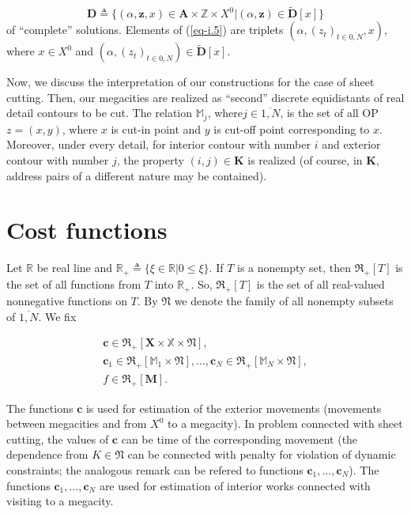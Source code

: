 \documentclass{article}
\begin{document}
\begin{equation}
  \label{eq-i.5}
  \mathbf D \triangleq
  \{
    (\alpha,\mathbf z, x) \in \mathbf A \times \mathbb Z \times X^0
  |
    (\alpha,\mathbf z) \in \tilde {\mathbf D}[x]
  \}
\end{equation}
of ``complete'' solutions.
Elements of (\ref{eq-i.5})
are triplets
$(\alpha,(z_t)_{t \in \overline{0,N}}, x)$,
where
$x \in X^0$
and
$(\alpha,(z_t)_{t \in \overline{0,N}}) \in \tilde {\mathbf D}[x]$.

Now, we discuss the interpretation of our constructions
for the case of sheet cutting.
Then, our megacities are realized as ``second''
discrete equidistants of real detail contours to be cut.
The relation
$\mathbb M_j$,
where$j \in \overline{1,N}$,
is the set of all OP
$z=(x,y)$,
where
$x$ is cut-in point and
$y$ is cut-off point corresponding to $x$.
Moreover,
under every detail,
for interior contour with number $i$
and exterior contour with number $j$,
the property
$(i,j) \in \mathbf K$
is realized
(of course, in $\mathbf K$,
address pairs of a different nature
may be contained).

\section*{Cost functions}

Let
$\mathbb R$
be real line and
$\mathbb R_+ \triangleq \{ \xi \in \mathbb R | 0 \leqslant \xi\}$.
If $T$ is a nonempty set,
then
$\mathfrak R_+[T]$
is the set of all functions from $T$
into $\mathbb R_+$.
So,
$\mathfrak R_+[T]$
is the set of all real-valued nonnegative functions on $T$.
By
$\mathfrak N$
we denote the family of all nonempty subsets of
$\overline{1,N}$.
We fix

\begin{multline}
  \label{eq-i.6}
\mathbf c \in \mathfrak R_+[\mathbf X \times \mathbb X \times \mathfrak N], \\
\mathbf c_1 \in \mathfrak R_+[\mathbb M_1 \times \mathfrak N],
\dots ,
\mathbf c_N \in \mathfrak R_+[\mathbb M_N \times \mathfrak N], \\
f \in \mathfrak R_+[\mathbf M].
\end{multline}

The functions
$\mathbf c$
is used for estimation of the exterior movements
(movements between megacities and from $X^0$ to a megacity).
In problem connected with sheet cutting,
the values of
$\mathbf c$
can be time of the corresponding movement
(the dependence from
$K \in \mathfrak N$
can be connected with penalty for violation of dynamic constraints;
the analogous remark can be refered to functions
$\mathbf c_1, \dots, \mathbf c_N$).
The functions
$\mathbf c_1, \dots, \mathbf c_N$
are used for estimation of interior works
connected with visiting to a megacity.
\end{document}
